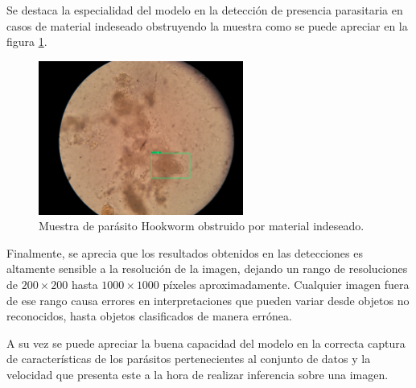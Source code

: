 \documentclass[letter,12pt]{report}
\begin{document}
Se destaca la especialidad del modelo en la detección de presencia parasitaria en casos de
material indeseado obstruyendo la muestra como se puede apreciar en la figura
\ref{fig:obstruction}.

\begin{figure}[ht]
    \centering
    \includegraphics[width=0.6\textwidth]{obstruction}
    \caption{Muestra de parásito Hookworm obstruido por material indeseado.}
    \label{fig:obstruction}
\end{figure}

Finalmente, se aprecia que los resultados obtenidos en las detecciones es altamente sensible
a la resolución de la imagen, dejando un rango de resoluciones de $200\times200$ hasta
$1000\times1000$ píxeles aproximadamente. Cualquier imagen fuera de ese rango causa errores en
interpretaciones que pueden variar desde objetos no reconocidos, hasta objetos clasificados
de manera errónea.

A su vez se puede apreciar la buena capacidad del modelo en la correcta captura de
características de los parásitos pertenecientes al conjunto de datos y la velocidad que 
presenta este a la hora de realizar inferencia sobre una imagen.
\end{document}
